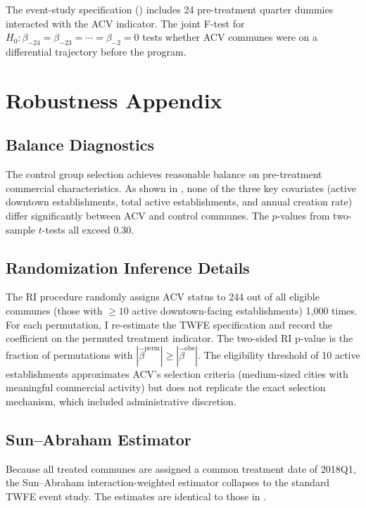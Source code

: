 \documentclass[12pt]{article}
\begin{document}
The event-study specification () includes 24 pre-treatment quarter dummies interacted with the ACV indicator. The joint F-test for $H_0: \beta_{-24} = \beta_{-23} = \cdots = \beta_{-2} = 0$ tests whether ACV communes were on a differential trajectory before the program.


\section{Robustness Appendix}
\label{app:robustness}

\subsection{Balance Diagnostics}

The control group selection achieves reasonable balance on pre-treatment commercial characteristics. As shown in , none of the three key covariates (active downtown establishments, total active establishments, and annual creation rate) differ significantly between ACV and control communes. The $p$-values from two-sample $t$-tests all exceed 0.30.

\subsection{Randomization Inference Details}

The RI procedure randomly assigns ACV status to 244 out of all eligible communes (those with $\geq 10$ active downtown-facing establishments) 1,000 times. For each permutation, I re-estimate the TWFE specification and record the coefficient on the permuted treatment indicator. The two-sided RI p-value is the fraction of permutations with $|\hat{\beta}^{\text{perm}}| \geq |\hat{\beta}^{\text{obs}}|$. The eligibility threshold of 10 active establishments approximates ACV's selection criteria (medium-sized cities with meaningful commercial activity) but does not replicate the exact selection mechanism, which included administrative discretion.

\subsection{Sun--Abraham Estimator}

Because all treated communes are assigned a common treatment date of 2018Q1, the Sun--Abraham interaction-weighted estimator \citep{sun2021estimating} collapses to the standard TWFE event study. The estimates are identical to those in .
\end{document}
